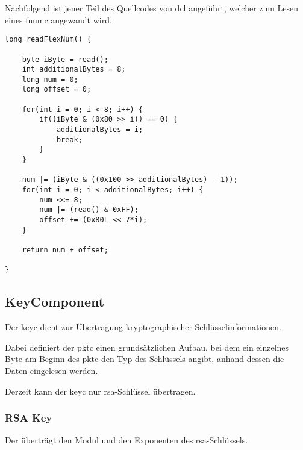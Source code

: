 Nachfolgend ist jener Teil des Quellcodes von \gls{dcl} angeführt, welcher zum Lesen eines
\gls{fnumc} angewandt wird.\\

\javalisting
\begin{lstlisting}[caption={Lesen eines \gls*{fnumc} (Java)},captionpos=b]
long readFlexNum() {

	byte iByte = read();
	int additionalBytes = 8;
	long num = 0;
	long offset = 0;

	for(int i = 0; i < 8; i++) {
		if((iByte & (0x80 >> i)) == 0) {
			additionalBytes = i;
			break;
		}
	}

	num |= (iByte & ((0x100 >> additionalBytes) - 1));
	for(int i = 0; i < additionalBytes; i++) {
		num <<= 8;
		num |= (read() & 0xFF);
		offset += (0x80L << 7*i);
	}

	return num + offset;

}
\end{lstlisting}


\subsection*{KeyComponent}
\label{dcl-packetcomponents-key}

Der \gls{keyc} dient zur Übertragung kryptographischer Schlüsselinformationen.

Dabei definiert der \gls{pktc} einen grundsätzlichen Aufbau, bei dem ein
einzelnes Byte am Beginn des \gls{pktc} den Typ des Schlüssels angibt, anhand
dessen die Daten eingelesen werden.

\keycbytefield

Derzeit kann der \gls{keyc} nur \gls{rsa}-Schlüssel übertragen.

\subsubsection{RSA Key}
\label{dcl-keyc-rsa}
Der \comp{\keycrsa} überträgt den Modul und den Exponenten des
\gls{rsa}-Schlüssels.

\keycrsabytefield
